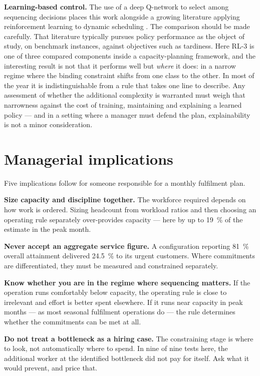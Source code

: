 \textbf{Learning-based control.} The use of a deep Q-network to select among sequencing
decisions places this work alongside a growing literature applying reinforcement learning to
dynamic scheduling \citep{luo2020,liu2024}. The comparison should be made carefully. That
literature typically pursues policy performance as the object of study, on benchmark instances,
against objectives such as tardiness. Here RL-3 is one of three compared components inside a
capacity-planning framework, and the interesting result is not that it performs well but
\emph{where} it does: in a narrow regime where the binding constraint shifts from one class to
the other. In most of the year it is indistinguishable from a rule that takes one line to
describe. Any assessment of whether the additional complexity is warranted must weigh that
narrowness against the cost of training, maintaining and explaining a learned policy --- and in
a setting where a manager must defend the plan, explainability is not a minor consideration.

\section{Managerial implications}
\label{sec:disc-managerial}

Five implications follow for someone responsible for a monthly fulfilment plan.

\textbf{Size capacity and discipline together.} The workforce required depends on how work is
ordered. Sizing headcount from workload ratios and then choosing an operating rule separately
over-provides capacity --- here by up to \SI{19}{\percent} of the estimate in the peak month.

\textbf{Never accept an aggregate service figure.} A configuration reporting \SI{81}{\percent}
overall attainment delivered \SI{24.5}{\percent} to its urgent customers. Where commitments are
differentiated, they must be measured and constrained separately.

\textbf{Know whether you are in the regime where sequencing matters.} If the operation runs
comfortably below capacity, the operating rule is close to irrelevant and effort is better spent
elsewhere. If it runs near capacity in peak months --- as most seasonal fulfilment operations do
--- the rule determines whether the commitments can be met at all.

\textbf{Do not treat a bottleneck as a hiring case.} The constraining stage is where to look,
not automatically where to spend. In nine of nine tests here, the additional worker at the
identified bottleneck did not pay for itself. Ask what it would prevent, and price that.

